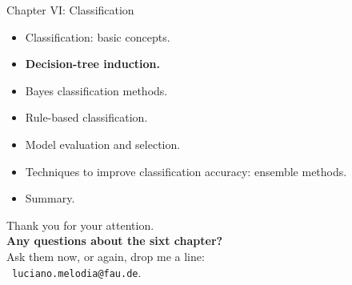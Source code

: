 \documentclass[aspectratio=169,t,table]{beamer}
\begin{document}
  {
    \begin{frame}{Chapter VI: Classification}
        \begin{itemize}
            \item Classification: basic concepts.
            \item \textbf{Decision-tree induction.}
            \item Bayes classification methods.
            \item Rule-based classification.
            \item Model evaluation and selection.
            \item Techniques to improve classification accuracy: ensemble methods.
            \item Summary.
        \end{itemize}
    \end{frame}
  }

  { %
    \begin{frame}[c]
      \begin{center}
        Thank you for your attention.\\
        {\bf Any questions about the sixt chapter?}\\[0.5cm]
        Ask them now, or again, drop me a line: \\
        \faSendO \ \texttt{luciano.melodia@fau.de}.
      \end{center}
    \end{frame}
  }
\end{document}
